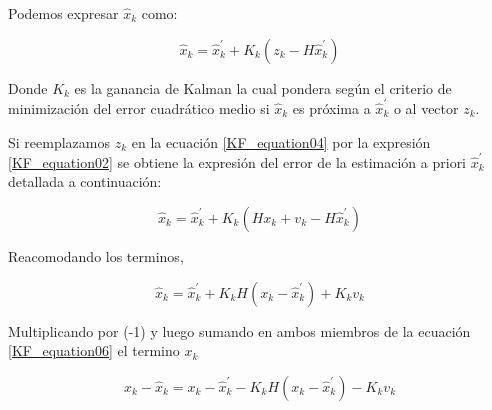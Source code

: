 \documentclass[10pt,a4paper]{article}
\begin{document}
\clearpage

Podemos expresar $\hat{x}_k$ como: 

\begin{figure}[h!]
	\begin{center}
		\begin{equation}
		\hat{x}_k = \hat{x}^\prime_k + K_k (z_k - H\hat{x}^\prime_k)
		\label{KF_equation04}
		\end{equation}	
	\end{center}
\end{figure}

Donde $K_k$ es la ganancia de Kalman la cual pondera según el criterio de minimización del error cuadrático medio si $\hat{x}_k$ es próxima a $\hat{x}^\prime_k$ o al vector $z_k$.

Si reemplazamos $z_k$ en la ecuación \ref{KF_equation04} por la expresión \ref{KF_equation02} se obtiene la expresión del error de la estimación a priori $\hat{x}^\prime_k$ detallada a continuación:

\begin{figure}[h!]
	\begin{center}
		\begin{equation}
		\hat{x}_k = \hat{x}^\prime_k + K_k (Hx_{k} + v_{k} - H\hat{x}^\prime_k)
		\label{KF_equation05}
		\end{equation}	
	\end{center}
\end{figure}

Reacomodando los terminos, 

\begin{figure}[h!]
	\begin{center}
		\begin{equation}
		\hat{x}_k = \hat{x}^\prime_k + K_k H (x_{k}  - \hat{x}^\prime_k) + K_kv_{k}
		\label{KF_equation06}
		\end{equation}	
	\end{center}
\end{figure}

Multiplicando por (-1) y luego sumando en ambos miembros de la ecuación \ref{KF_equation06} el termino $x_k$ 

\begin{figure}[h!]
	\begin{center}
		\begin{equation}
		x_k - \hat{x}_k = x_{k} -\hat{x}^\prime_k - K_k H (x_{k}  - \hat{x}^\prime_k) - K_kv_{k}
		\label{KF_equation08}
		\end{equation}	
	\end{center}
\end{figure}
\end{document}
